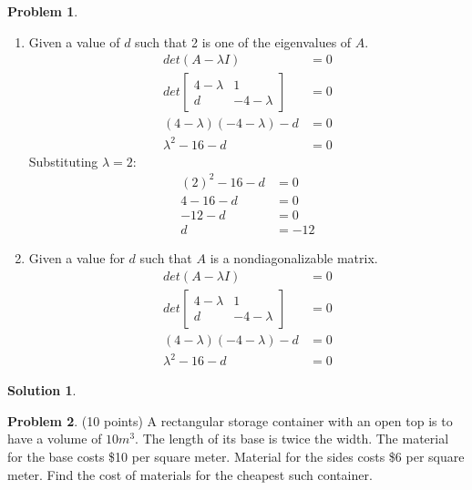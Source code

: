 \documentclass[11pt]{article}
\theoremstyle{definition}
\newtheorem{problem}{Problem}
\newtheorem*{solution}{Solution}
\begin{document}
\begin{problem}
\begin{enumerate}[label=(\alph*)]
    \item Given a value of $d$ such that 2 is one of the eigenvalues of $A$.
    \begin{align}
        det(A - \lambda I) &= 0 \\
        det\begin{bmatrix}
            4 - \lambda & 1 \\
            d & -4 - \lambda
        \end{bmatrix} &= 0 \\
        (4 - \lambda)(-4 - \lambda) - d &= 0 \\
        \lambda^2 - 16 - d &= 0
    \end{align}
    Substituting $\lambda = 2$:
    \begin{align}
        (2)^2 - 16 - d &= 0 \\
        4 - 16 - d &= 0 \\
        -12 - d &= 0 \\
        d &= -12
    \end{align}

    \item Given a value for $d$ such that $A$ is a nondiagonalizable matrix.
    \begin{align}
        det(A - \lambda I) &= 0 \\
        det\begin{bmatrix}
            4 - \lambda & 1 \\
            d & -4 - \lambda
        \end{bmatrix} &= 0 \\
        (4 - \lambda)(-4 - \lambda) - d &= 0 \\
        \lambda^2 - 16 - d &= 0
    \end{align}

\end {enumerate}
\end{problem}

\begin{solution}
\end{solution}


\begin{problem}
(10 points)  A rectangular storage container with an open top is to have a volume of $10m^3$.  
The length of its base is twice the width.  The material for the base costs \$10 per square meter.  
Material for the sides costs \$6 per square meter.  Find the cost of materials for the cheapest such container.
\end{problem}
\end{document}
